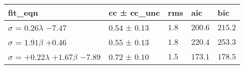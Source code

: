 \begin{tabular}{lllll}
\toprule
fit_eqn & cc ± cc_unc & rms & aic & bic \\
\midrule
$\sigma$ = $0.26$$\lambda$ $-7.47$ & $0.54$ ± $0.13$ & $1.8$ & $200.6$ & $215.2$ \\
$\sigma$ = $1.91$$\beta$ $+0.46$ & $0.55$ ± $0.13$ & $1.8$ & $220.4$ & $253.3$ \\
$\sigma$ = $+0.22$$\lambda$ $+1.67$$\beta$ $-7.89$ & $0.72$ ± $0.10$ & $1.5$ & $173.1$ & $178.5$ \\
\bottomrule
\end{tabular}
